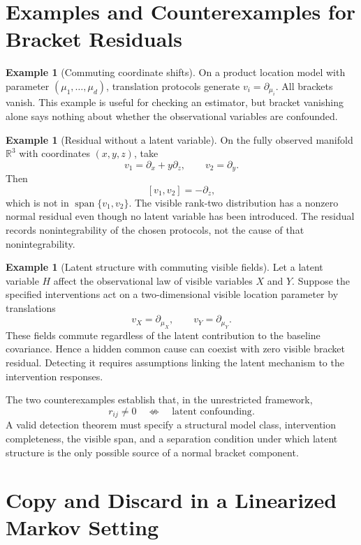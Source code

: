 \documentclass{article}
\theoremstyle{plain}
\theoremstyle{definition}
\newtheorem{example}[theorem]{Example}
\theoremstyle{remark}
\newcommand{\R}{\mathbb R}
\newcommand{\Span}{\operatorname{span}}
\begin{document}
\section{Examples and Counterexamples for Bracket Residuals}
\label{sec:examples}

\begin{example}[Commuting coordinate shifts]
On a product location model with parameter \((\mu_1,\ldots,\mu_d)\), translation
protocols generate \(v_i=\partial_{\mu_i}\).  All brackets vanish.  This example
is useful for checking an estimator, but bracket vanishing alone says nothing
about whether the observational variables are confounded.
\end{example}

\begin{example}[Residual without a latent variable]
\label{ex:no-latent-residual}
On the fully observed manifold \(\R^3\) with coordinates \((x,y,z)\), take
\[
  v_1=\partial_x+y\partial_z,
  \qquad
  v_2=\partial_y .
\]
Then
\[
  [v_1,v_2]=-\partial_z,
\]
which is not in \(\Span\{v_1,v_2\}\).  The visible rank-two distribution has a
nonzero normal residual even though no latent variable has been introduced.
The residual records nonintegrability of the chosen protocols, not the cause of
that nonintegrability.
\end{example}

\begin{example}[Latent structure with commuting visible fields]
Let a latent variable \(H\) affect the observational law of visible variables
\(X\) and \(Y\).  Suppose the specified interventions act on a two-dimensional
visible location parameter by translations
\[
  v_X=\partial_{\mu_X},
  \qquad
  v_Y=\partial_{\mu_Y}.
\]
These fields commute regardless of the latent contribution to the baseline
covariance.  Hence a hidden common cause can coexist with zero visible bracket
residual.  Detecting it requires assumptions linking the latent mechanism to
the intervention responses.
\end{example}

The two counterexamples establish that, in the unrestricted framework,
\[
  r_{ij}\ne0
  \quad\not\Longleftrightarrow\quad
  \text{latent confounding}.
\]
A valid detection theorem must specify a structural model class, intervention
completeness, the visible span, and a separation condition under which latent
structure is the only possible source of a normal bracket component.

\section{Copy and Discard in a Linearized Markov Setting}
\label{sec:markov}
\end{document}
